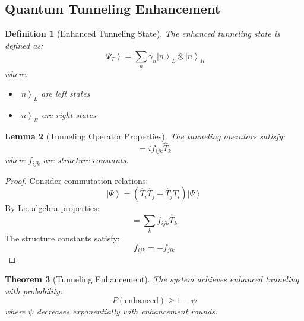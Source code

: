\documentclass[12pt]{article}
\newcommand{\ket}[1]{\left|#1\right\rangle}
\newcommand{\op}[1]{\hat{#1}}
\newtheorem{theorem}{Theorem}[section]
\newtheorem{lemma}[theorem]{Lemma}
\newtheorem{definition}[theorem]{Definition}
\begin{document}
\subsection{Quantum Tunneling Enhancement}
\begin{definition}[Enhanced Tunneling State]
The enhanced tunneling state is defined as:
\begin{equation}
\ket{\Psi_T} = \sum_n \gamma_n\ket{n}_L \otimes \ket{n}_R
\end{equation}
where:
\begin{itemize}
\item $\ket{n}_L$ are left states
\item $\ket{n}_R$ are right states
\end{itemize}
\end{definition}
\begin{lemma}[Tunneling Operator Properties]
The tunneling operators satisfy:
\begin{equation}
[\op{T}_i,\op{T}_j] = if_{ijk}\op{T}_k
\end{equation}
where $f_{ijk}$ are structure constants.
\end{lemma}
\begin{proof}
Consider commutation relations:
\begin{equation}
[\op{T}_i,\op{T}_j]\ket{\Psi} = (\op{T}_i\op{T}_j - \op{T}_j\op{T}_i)\ket{\Psi}
\end{equation}
By Lie algebra properties:
\begin{equation}
[\op{T}_i,\op{T}_j] = \sum_k f_{ijk}\op{T}_k
\end{equation}
The structure constants satisfy:
\begin{equation}
f_{ijk} = -f_{jik}
\end{equation}
\end{proof}
\begin{theorem}[Tunneling Enhancement]
The system achieves enhanced tunneling with probability:
\begin{equation}
P(\text{enhanced}) \geq 1 - \psi
\end{equation}
where $\psi$ decreases exponentially with enhancement rounds.
\end{theorem}
\end{document}
